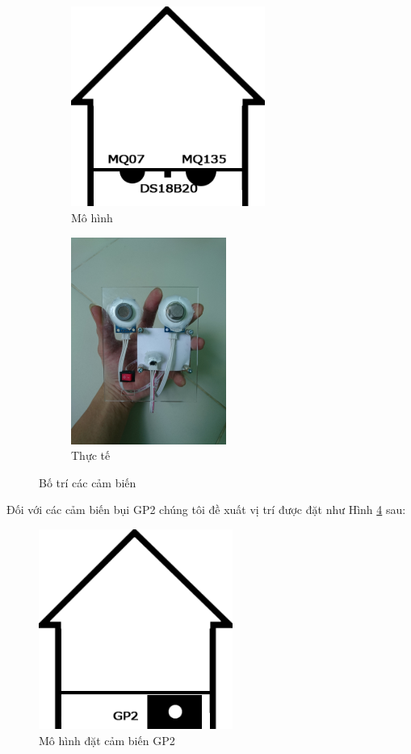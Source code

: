 \begin{figure}[H]
	\centering  
	\begin{subfigure}[b]{0.5\textwidth}
		\includegraphics[width=2.5in]{house_sensor}
		\caption[Mô hình]{Mô hình}
		\label{fig:house_sensor}
	\end{subfigure}\hfill
	\begin{subfigure}[b]{0.5\textwidth}
		\includegraphics[width=2in]{house_sensor_2}
		\caption[Thực tế]{Thực tế}
		\label{fig:house_sensor_2}
	\end{subfigure}
	\caption{Bố trí các cảm biến}\label{fig:botri}
\end{figure}
Đối với các cảm biến bụi GP2 chúng tôi đề xuất vị trí được đặt như Hình \ref{fig:house_dust} sau:
\begin{figure}[H]
	\centering    
	\includegraphics[width=2.5in]{house_dust}
	\caption[Mô hình đặt cảm biến GP2]{Mô hình đặt cảm biến GP2}
	\label{fig:house_dust}
\end{figure}
